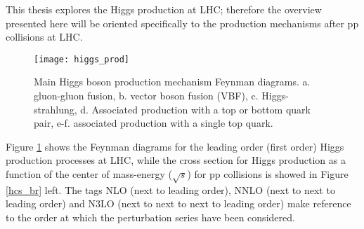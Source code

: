 This thesis explores the Higgs production at LHC; therefore the overview presented here will be oriented specifically to the production mechanisms after pp collisions at LHC.

\begin{figure}[!h]
\centering
\texttt{[image: higgs\_prod]}
\caption[Higgs boson production mechanism Feynman diagrams]{Main Higgs boson production mechanism Feynman diagrams. a. gluon-gluon fusion, b. vector boson fusion (VBF), c. Higgs-strahlung, d. Associated production with a top or bottom quark pair, e-f. associated production with a single top quark.}
\label{higgs_prod}
\end{figure}

Figure \ref{higgs_prod} shows the Feynman diagrams for the leading order (first order) Higgs production processes at LHC, while the cross section for Higgs production as a function of the center of mass-energy ($\sqrt{s}$) for pp collisions is showed in Figure \ref{hcs_br} left. The tags NLO (next to leading order), NNLO (next to next to leading order) and N3LO (next to next to next to leading order) make reference to the order at which the perturbation series have been considered.

